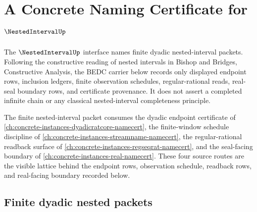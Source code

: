 \chapter{A Concrete Naming Certificate for $\NestedIntervalUp$}
\label{ch:concrete-instances-nestedinterval-namecert}

The $\NestedIntervalUp$ interface names finite dyadic nested-interval packets. Following the constructive reading of nested intervals in Bishop and Bridges, Constructive Analysis, the BEDC carrier below records only displayed endpoint rows, inclusion ledgers, finite observation schedules, regular-rational reads, real-seal boundary rows, and certificate provenance. It does not assert a completed infinite chain or any classical nested-interval completeness principle.

The finite nested-interval packet consumes the dyadic endpoint certificate of \autoref{ch:concrete-instances-dyadicratcore-namecert}, the finite-window schedule discipline of \autoref{ch:concrete-instances-streamname-namecert}, the regular-rational readback surface of \autoref{ch:concrete-instances-regseqrat-namecert}, and the seal-facing boundary of \autoref{ch:concrete-instances-real-namecert}. These four source routes are the visible lattice behind the endpoint rows, observation schedule, readback rows, and real-facing boundary recorded below.

\section{Finite dyadic nested packets}
\label{sec:nestedinterval-finite-dyadic-packets}

